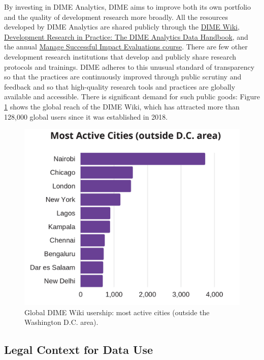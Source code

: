 By investing in DIME Analytics, DIME aims to improve both its own portfolio and the quality of development research more broadly. All the resources developed by DIME Analytics are shared publicly through the \href{https://dimewiki.worldbank.org/}{DIME Wiki}, \href{https://worldbank.github.io/dime-data-handbook/}{Development Research in Practice: The DIME Analytics Data Handbook}, and the annual \href{https://www.worldbank.org/en/events/2019/06/10/manage-successful-impact-evaluations}{Manage Successful Impact Evaluations course}. There are few other development research institutions that develop and publicly share research protocols and trainings. DIME adheres to this unusual standard of transparency so that the practices are continuously improved through public scrutiny and feedback and so that high-quality research tools and practices are globally available and accessible. There is significant demand for such public goods: Figure \ref{fig:dimefigure4} shows the global reach of the DIME Wiki, which has attracted more than 128,000 global users since it was established in 2018.

\begin{figure}
\centering
\includegraphics{./figures/dimefigure4} \caption{Global DIME Wiki usership: most active cities (outside the Washington D.C. area). }\label{fig:dimefigure4}
\end{figure}

\hypertarget{legal-context-for-data-use-6}{%
\subsection{Legal Context for Data Use}\label{legal-context-for-data-use-6}}

